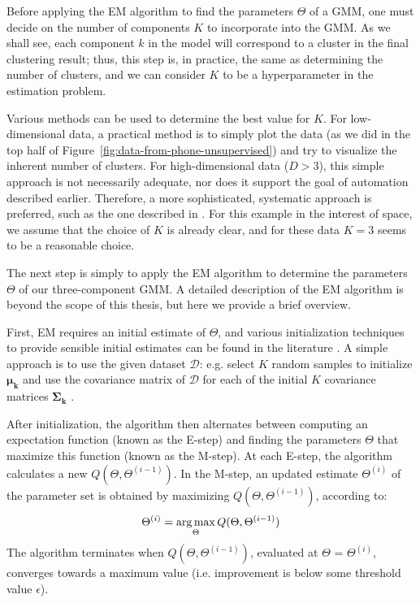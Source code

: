 Before applying the EM algorithm to find the parameters $\Theta$ of a GMM, one must decide on the number of components $K$ to incorporate into the GMM. As we shall see, each component $k$ in the model will correspond to a cluster in the final clustering result; thus, this step is, in practice, the same as determining the number of clusters, and we can consider $K$ to be a hyperparameter in the estimation problem.

Various methods can be used to determine the best value for $K$. For low-dimensional data, a practical method is to simply plot the data (as we did in the top half of Figure~\ref{fig:data-from-phone-unsupervised}) and try to visualize the inherent number of clusters. For high-dimensional data ($D>3$), this simple approach is not necessarily adequate, nor does it support the goal of automation described earlier. Therefore, a more sophisticated, systematic approach is preferred, such as the one described in \cite{vlassis2002greedy}. For this example in the interest of space, we assume that the choice of $K$ is already clear, and for these data $K=3$ seems to be a reasonable choice.

The next step is simply to apply the EM algorithm to determine the parameters $\Theta$ of our three-component GMM. A detailed description of the EM algorithm is beyond the scope of this thesis, but here we provide a brief overview.

First, EM requires an initial estimate of $\Theta$, and various initialization techniques to provide sensible initial estimates can be found in the literature . A simple approach is to use the given dataset $\mathcal{D}$: e.g. select $K$ random samples to initialize $\boldsymbol{\mu_k}$ and use the covariance matrix of $\mathcal{D}$ for each of the initial $K$ covariance matrices $\boldsymbol{\Sigma_k}$ \cite{Smyth2015}.

After initialization, the algorithm then alternates between computing an expectation function (known as the E-step) and finding the parameters $\Theta$ that maximize this function (known as the M-step). At each E-step, the algorithm calculates a new $Q(\Theta,\Theta^{(i-1)})$. In the M-step, an updated estimate $\Theta^{(i)}$ of the parameter set is obtained by maximizing $Q(\Theta,\Theta^{(i-1)})$, according to:
%
\begin{equation}
 \Theta^{(i)} = \operatorname*{arg\,max}_\Theta{Q(\Theta,\Theta^{(i-1)})}
\end{equation}
%
The algorithm terminates when $Q(\Theta,\Theta^{(i-1)})$, evaluated at $\Theta$ = $\Theta^{(i)}$, converges towards a maximum value (i.e. improvement is below some threshold value $\epsilon$).

